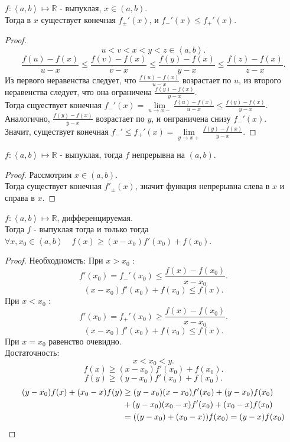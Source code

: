 \documentclass[11pt, oneside]{article}   	%
\begin{document}
\begin{theorem}
    $f: \left<a, b\right> \mapsto \mathbb{R}$ - выпуклая, $x\in \left( a, b \right) $.\\
    Тогда в $x$ существует конечная $f_{\pm}'(x)$, и $f_{-}'(x) \le f_{+}'(x)$.
    \begin{proof}
       \[ u < v < x < y < z\in \left<a, b\right> .\]
       \[ \frac{f(u)-f(x)}{u-x} \le \frac{f(v)-f(x)}{v-x} \le \frac{f(y)-f(x)}{y-x} \le \frac{f(z) - f(x)}{z-x} .\]
       Из первого неравенства следует, что $\frac{f(u)-f(x)}{u-x}$ возрастает по $u$, из второго неравенства следует, что она ограничена $\frac{f(y)-f(x)}{y-x}$.\\
       Тогда сщуествует конечная $f_{-}'(x) = \lim\limits_{u \to x-} \frac{f(u)-f(x)}{u-x} \le \frac{f(y)-f(x)}{y-x}$.\\
       Аналогично, $\frac{f(y)-f(x)}{y-x}$ возрастает по $y$, и онграничена снизу $f_{-}'(x)$.\\
       Значит, существует конечная $f_{-}' \le f_{+}'(x) = \lim\limits_{y \to x+} \frac{f(y)-f(x)}{y-x}$.
    \end{proof}
\end{theorem}
\begin{tlemma}
    $f : \left<a, b\right> \mapsto \mathbb{R}$ - выпуклая, тогда $f$ непрерывна на $\left( a, b \right) $.\\
    \begin{proof}
        Рассмотрим $x\in \left( a, b \right) $.\\
        Тогда существует конечная $f'_{\pm}(x)$, значит функция непрерывна слева в $x$ и справа в $x$.
    \end{proof}
\end{tlemma}
\begin{theorem}
    $f : \left<a, b\right> \mapsto \mathbb{R}$, дифференцируемая.\\
    Тогда $f$ - выпуклая тогда и только тогда $\forall{x, x_0\in \left<a, b\right>}\quad f(x) \ge (x-x_0)f'(x_0)+f(x_0)$.
    \begin{proof}
        Необходиомсть:
        При $x>x_0$ :
        \[ f'(x_0) = f_{-}'(x_0)\le  \frac{f(x)-f(x_0)}{x-x_0} .\]
        \[ (x-x_0)f'(x_0) + f(x_0) \le f(x) .\]
        При $x<x_0$ :
        \[ f'(x_0) = f_{+}'(x_0) \ge \frac{f(x)-f(x_0)}{x-x_0} .\]
        \[ (x-x_0)f'(x_0) + f(x_0) \le  f(x) .\]
        При $x=x_0$ равенство очевидно.\\
        Достаточность:
            \[ x < x_0 < y .\]
            \[ f(x) \ge (x-x_0)f'(x_0) + f(x_0) .\]
            \[ f(y) \ge  (y-x_0)f'(x_0) + f(x_0) .\]
            \begin{equation*}
                \begin{split}
                    (y-x_0)f(x) + (x_0-x)f(y) &\ge (y-x_0)(x-x_0)f'(x_0) + (y-x_0)f(x_0)\\
                                              &+(y-x_0)(x_0-x)f'(x_0)+(x_0-x)f(x_0)\\
                                              &= ((y-x_0)+(x_0-x))f(x_0) = (y-x)f(x_0) \qedhere
                \end{split}
            \end{equation*}
    \end{proof}
\end{theorem}
\end{document}

